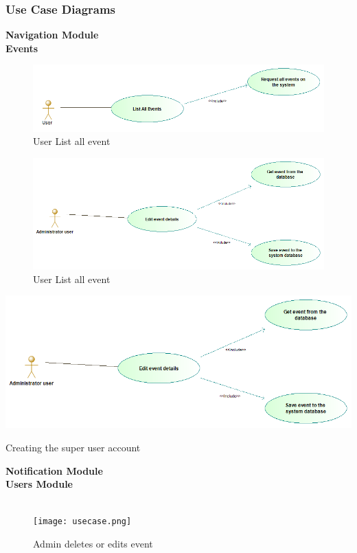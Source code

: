 \documentclass[a4paper,12pt]{report}
\begin{document}
	\subsubsection{Use Case Diagrams}
	\textbf{Navigation Module}\\
	\textbf{Events}\\
\begin{figure}[h!]
	\includegraphics[width=\linewidth]{./events/User-list-all-events-on-the-system.png}
    \caption{User List all event}
		 \label{fig:UC1}
\end{figure}
\begin{figure}[h!]
	\includegraphics[width=\linewidth]{./events/Administrator-user-edit-event-on-the-system.png}
	\caption{User List all event}
	\label{fig:UC1}
\end{figure}
\begin{flushleft}
	\includegraphics[scale=0.5]{./events/Administrator-user-edit-event-on-the-system.png}
	\begin{center}
		Creating the super user account
	\end{center}
\end{flushleft}
	\textbf{Notification Module}\\
	\textbf{Users Module}\\\\
	\begin{figure}[h!]
		\texttt{[image: usecase.png]}
		\caption{Admin deletes or edits event}
		\label{fig:UC4}
	\end{figure}
\end{document}
